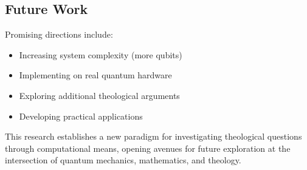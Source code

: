 \subsection{Future Work}
Promising directions include:
\begin{itemize}
    \item Increasing system complexity (more qubits)
    \item Implementing on real quantum hardware
    \item Exploring additional theological arguments
    \item Developing practical applications
\end{itemize}

This research establishes a new paradigm for investigating theological questions through computational means, opening avenues for future exploration at the intersection of quantum mechanics, mathematics, and theology.